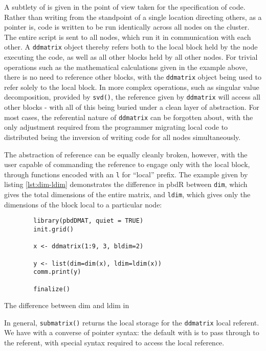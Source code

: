 A subtlety of  is given in the point of view taken for the
specification of code. Rather than writing from the standpoint of a
single location directing others, as a pointer is,  code is written
to be run identically across all nodes on the cluster. The entire script
is sent to all nodes, which run it in communication with each other. A
\texttt{ddmatrix} object thereby refers both to the local block held by
the node executing the code, as well as all other blocks held by all
other nodes. For trivial operations such as the mathematical
calculations given in the example above, there is no need to reference
other blocks, with the \texttt{ddmatrix} object being used to refer
solely to the local block. In more complex operations, such as singular
value decomposition, provided by \texttt{svd()}, the reference given by
\texttt{ddmatrix} will access all other blocks - with all of this being
buried under a clean layer of abstraction. For most cases, the
referential nature of \texttt{ddmatrix} can be forgotten about, with the
only adjustment required from the programmer migrating local code to
distributed being the inversion of writing code for all nodes
simultaneously.

The abstraction of reference can be equally cleanly broken, however,
with the user capable of commanding the reference to engage only with
the local block, through functions encoded with an \texttt{l} for
``local'' prefix. The example given by listing \cref{lst:dim-ldim} demonstrates the difference in
pbdR between \texttt{dim}, which gives the total dimensions of the
entire matrix, and \texttt{ldim}, which gives only the dimensions of the
block local to a particular node:

\begin{listing}
    \begin{verbatim}
        library(pbdDMAT, quiet = TRUE)
        init.grid()
        
        x <- ddmatrix(1:9, 3, bldim=2)
        
        y <- list(dim=dim(x), ldim=ldim(x))
        comm.print(y)
        
        finalize()
    \end{verbatim}
    \caption{The difference between dim and ldim in }
    \label{lst:dim-ldim}
\end{listing}

In general, \texttt{submatrix()} returns the local storage for the
\texttt{ddmatrix} local referent. We have with  a converse of
pointer syntax: the default with  is to pass through to the
referent, with special syntax required to access the local reference.

